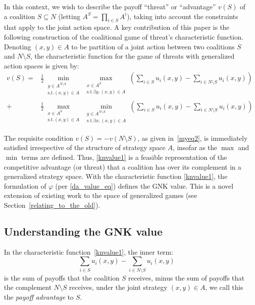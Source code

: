 In this context, we wish to describe the payoff ``threat'' or ``advantage'' $v(S)$ of a coalition $S\subseteq N$ (letting $A^S=\prod_{i\in S}A^i$), taking into account the constraints that apply to the joint action space.  
A key contribution of this paper is the following construction of the coalitional game of threat's characteristic function. 
Denoting $(x,y)\in A$ to be partition of a joint action between two coalitions $S$ and $N\setminus S$, 
the characteristic function for the game of threats with generalized action spaces is given by:
\begin{align}
\label{knvalue1}
v(S) = &
\frac{1}{2}\min_{\substack{y\in A^{N\setminus S} \\ \text{s.t.}(x,y)\in A}} 
\max_{\substack{x\in A^S \\ \text{s.t.}\exists y,(x,y)\in A}}
	\left(\sum_{i\in S} u_i(x,y) - \sum_{i\in N\setminus S}u_i(x,y)\right)\nonumber\\
+&
\frac{1}{2}\max_{\substack{x\in A^S \\ \text{s.t.}(x,y)\in A}} 
\min_{\substack{y\in A^{N\setminus S} \\ \text{s.t.}\exists x,(x,y)\in A}}
	\left(\sum_{i\in S} u_i(x,y) - \sum_{i\in N\setminus S} u_i(x,y) \right)
\end{align}

The requisite condition $v(S)=-v(N\setminus S)$, as given in~\eqref{myeq2}, is immediately satisfied irrespective of the structure of strategy space $A$, insofar as the $\max$ and $\min$ terms are defined.
Thus, \eqref{knvalue1} is a feasible representation of the competitive advantage (or threat) that a coalition has over its complement in a generalized strategy space.
With the characteristic function \eqref{knvalue1}, the formulation of $\varphi$ (per \eqref{da_value_eq}) defines the GNK value.
This is a novel extension of existing work to the space of generalized games (see Section~\ref{relating_to_the_old}).

\subsection{Understanding the GNK value}\label{the_value_def4}

In the characteristic function~\eqref{knvalue1}, the inner term:
\[
\sum_{i\in S} u_i(x,y) - \sum_{i\in N\setminus S} u_i(x,y)
\] 
is the sum of payoffs that the coalition $S$ receives, 
minus the sum of payoffs that the complement $N\setminus S$ receives, 
under the joint strategy $(x,y)\in A$, we call this the \textit{payoff advantage} to $S$.

